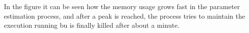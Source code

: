 \begin{itemize}
    In the figure it can be seen how the memory usage grows fast in the parameter estimation process, and after a peak is reached, the process tries to maintain the execution running bu is finally killed after about a minute. 
\end{itemize}